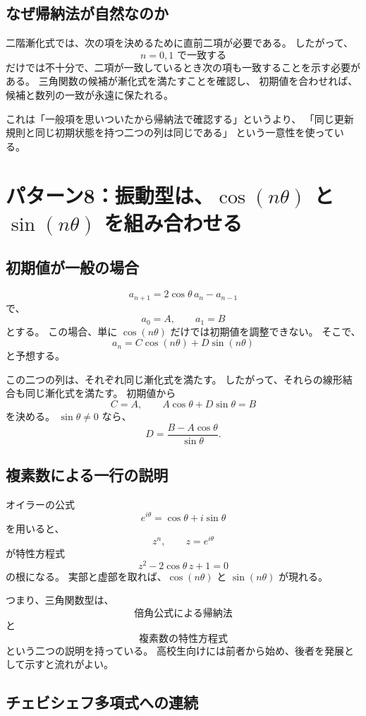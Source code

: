 \subsection{なぜ帰納法が自然なのか}

二階漸化式では、次の項を決めるために直前二項が必要である。
したがって、
\[
  n=0,1\text{ で一致する}
\]
だけでは不十分で、二項が一致しているとき次の項も一致することを示す必要がある。
三角関数の候補が漸化式を満たすことを確認し、
初期値を合わせれば、候補と数列の一致が永遠に保たれる。

これは「一般項を思いついたから帰納法で確認する」というより、
「同じ更新規則と同じ初期状態を持つ二つの列は同じである」
という一意性を使っている。

\section{パターン8：振動型は、$\cos(n\theta)$ と $\sin(n\theta)$ を組み合わせる}

\subsection{初期値が一般の場合}

\[
  a_{n+1}=2\cos\theta\,a_n-a_{n-1}
\]
で、
\[
  a_0=A,\qquad a_1=B
\]
とする。
この場合、単に $\cos(n\theta)$ だけでは初期値を調整できない。
そこで、
\[
  a_n=C\cos(n\theta)+D\sin(n\theta)
\]
と予想する。

この二つの列は、それぞれ同じ漸化式を満たす。
したがって、それらの線形結合も同じ漸化式を満たす。
初期値から
\[
  C=A,\qquad
  A\cos\theta+D\sin\theta=B
\]
を決める。
$\sin\theta\neq0$ なら、
\[
  D=\frac{B-A\cos\theta}{\sin\theta}.
\]

\subsection{複素数による一行の説明}

オイラーの公式
\[
  e^{i\theta}=\cos\theta+i\sin\theta
\]
を用いると、
\[
  z^n,\qquad z=e^{i\theta}
\]
が特性方程式
\[
  z^2-2\cos\theta\,z+1=0
\]
の根になる。
実部と虚部を取れば、$\cos(n\theta)$ と $\sin(n\theta)$ が現れる。

つまり、三角関数型は、
\[
  \text{倍角公式による帰納法}
\]
と
\[
  \text{複素数の特性方程式}
\]
という二つの説明を持っている。
高校生向けには前者から始め、後者を発展として示すと流れがよい。

\subsection{チェビシェフ多項式への連続}

